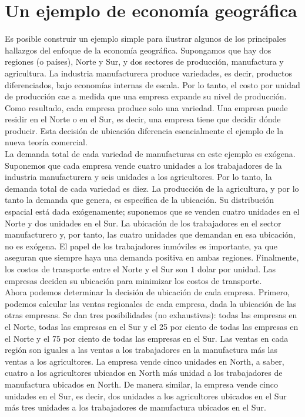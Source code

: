 \section{Un ejemplo de economía geográfica}
Es posible construir un ejemplo simple para ilustrar algunos de los principales hallazgos del enfoque de la economía geográfica. Supongamos que hay dos regiones (o países), Norte y Sur, y dos sectores de producción, manufactura y agricultura. La industria manufacturera produce variedades, es decir, productos diferenciados, bajo economías internas de escala. Por lo tanto, el costo por unidad de producción cae a medida que una empresa expande su nivel de producción. Como resultado, cada empresa produce solo una variedad. Una empresa puede residir en el Norte o en el Sur, es decir, una empresa tiene que decidir dónde producir. Esta decisión de ubicación diferencia esencialmente el ejemplo de la nueva teoría comercial.\\
La demanda total de cada variedad de manufacturas en este ejemplo es exógena. Suponemos que cada empresa vende cuatro unidades a los trabajadores de la industria manufacturera y seis unidades a los agricultores. Por lo tanto, la demanda total de cada variedad es diez. La producción de la agricultura, y por lo tanto la demanda que genera, es específica de la ubicación. Su distribución espacial está dada exógenamente; suponemos que se venden cuatro unidades en el Norte y dos unidades en el Sur. La ubicación de los trabajadores en el sector manufacturero y, por tanto, las cuatro unidades que demandan en esa ubicación, no es exógena. El papel de los trabajadores inmóviles es importante, ya que aseguran que siempre haya una demanda positiva en ambas regiones. Finalmente, los costos de transporte entre el Norte y el Sur son $1$ dolar por unidad. Las empresas deciden su ubicación para minimizar los costos de transporte.\\
Ahora podemos determinar la decisión de ubicación de cada empresa. Primero, podemos calcular las ventas regionales de cada empresa, dada la ubicación de las otras empresas. Se dan tres posibilidades (no exhaustivas): todas las empresas en el Norte, todas las empresas en el Sur y el 25 por ciento de todas las empresas en el Norte y el 75 por ciento de todas las empresas en el Sur. Las ventas en cada región son iguales a las ventas a los trabajadores en la manufactura más las ventas a los agricultores. La empresa vende cinco unidades en North, a saber, cuatro a los agricultores ubicados en North más  unidad a los trabajadores de manufactura ubicados en North. De manera similar, la empresa vende cinco unidades en el Sur, es decir, dos unidades a los agricultores ubicados en el Sur más tres unidades a los trabajadores de manufactura ubicados en el Sur.\\

